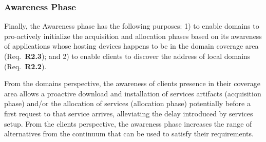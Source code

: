 



\subsubsection*{Awareness Phase}\label{sec:A3-E-awareness}



Finally, the Awareness phase has the following purposes: 1) to enable domains to pro-actively initialize the acquisition and allocation phases based on its 
awareness of applications whose hosting devices happens to be in the domain coverage area (Req.~\textbf{R2.3}); and 2) to enable clients to discover the address of local domains (Req.~\textbf{R2.2}).

From the domains perspective, the awareness of clients presence in their coverage area allows a proactive download and installation of services artifacts (acquisition phase) and/or the allocation of services (allocation phase) potentially before a first request to that service arrives, alleviating the delay introduced by services setup.  From the clients perspective, the awareness phase increases the range of alternatives from the continuum that can be used to satisfy their requirements.

